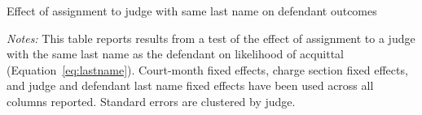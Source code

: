 \documentclass[12pt,english]{article}
\newcommand{\HOME}{\string~}
\newcommand{\curpath}{\HOME/ddl/justice-overleaf}
\newcommand{\curpath}{.}
\begin{document}
\clearpage 

\begin{table}
  \begin{center}
    \caption{Effect of assignment to judge with same last name on defendant outcomes}
    \label{tab:last_name}
    
    \resizebox{\linewidth}{!}{
    
  }
  \begin{minipage}{\textwidth}
    \scriptsize \emph{Notes:} This table reports results from a test of the effect of assignment to a judge with the same last name as the defendant on likelihood of acquittal (Equation~\ref{eq:lastname}). Court-month fixed effects, charge section fixed effects, and judge and defendant last name fixed effects have been used across all columns reported. Standard errors are clustered by judge.\\  
  \end{minipage}
    \end{center}
\end{table}


\clearpage
\end{document}
